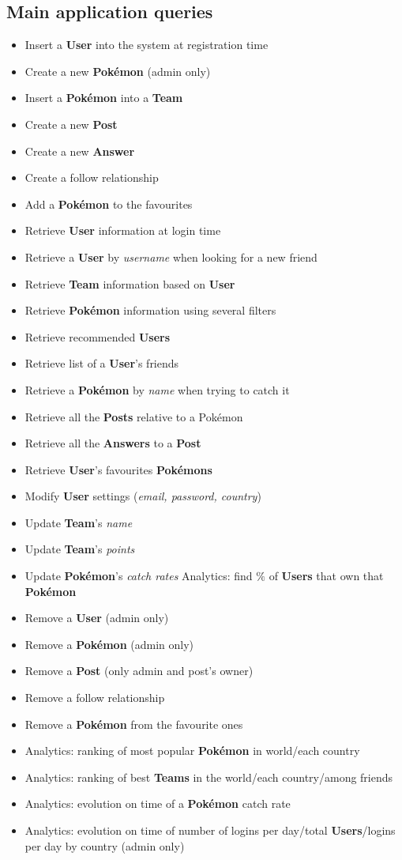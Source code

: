 \subsection{Main application queries}
\begin{itemize}
	\item Insert a \textbf{User} into the system at registration time
	\item Create a new \textbf{Pokémon} (admin only)
	\item Insert a \textbf{Pokémon} into a \textbf{Team}
	\item Create a new \textbf{Post}
	\item Create a new \textbf{Answer}
	\item Create a follow relationship
	\item Add a \textbf{Pokémon} to the favourites
	\item Retrieve \textbf{User} information at login time
 	\item Retrieve a \textbf{User} by \textit{username }when looking for a new friend
	\item Retrieve \textbf{Team} information based on \textbf{User}
	\item Retrieve \textbf{Pokémon} information using several filters
	\item Retrieve recommended \textbf{Users}
	\item Retrieve list of a \textbf{User}’s friends
	\item Retrieve a \textbf{Pokémon} by \textit{name} when trying to catch it
	\item Retrieve all the \textbf{Posts} relative to a Pokémon
	\item Retrieve all the \textbf{Answers} to a \textbf{Post}
	\item Retrieve \textbf{User}’s favourites \textbf{Pokémons} 
	\item Modify \textbf{User} settings (\textit{email, password, country})
	\item Update \textbf{Team}’s \textit{name}
	\item Update \textbf{Team}’s \textit{points}
	\item Update \textbf{Pokémon}’s \textit{catch rates} Analytics: find $\%$ of \textbf{Users} that own that \textbf{Pokémon}
	\item Remove a \textbf{User} (admin only)
	\item Remove a \textbf{Pokémon} (admin only)
	\item Remove a \textbf{Post} (only admin and post’s owner)
	\item Remove a follow relationship
	\item Remove a \textbf{Pokémon} from the favourite ones
	\item Analytics: ranking of most popular \textbf{Pokémon} in world/each country
	\item Analytics: ranking of best \textbf{Teams} in the world/each country/among friends
	\item Analytics: evolution on time of a \textbf{Pokémon} catch rate
	\item Analytics: evolution on time of number of logins per day/total \textbf{Users}/logins per day by country (admin only)
\end{itemize}

